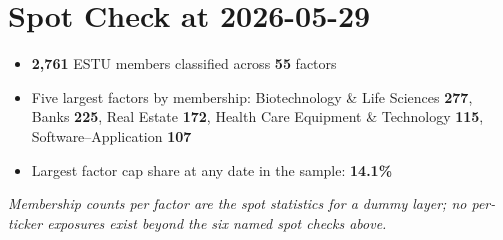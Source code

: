 \documentclass[11pt,a4paper]{article}
\newcommand{\NOTE}[1]{\textcolor{note}{\textit{#1}}}
\begin{document}
\section{Spot Check at 2026-05-29}

\begin{itemize}[leftmargin=*,topsep=2pt,itemsep=2pt]
  \item \textbf{2{,}761} ESTU members classified across \textbf{55} factors
  \item Five largest factors by membership: Biotechnology \& Life Sciences
    \textbf{277}, Banks \textbf{225}, Real Estate \textbf{172}, Health Care
    Equipment \& Technology \textbf{115}, Software--Application \textbf{107}
  \item Largest factor cap share at any date in the sample: \textbf{14.1\%}
\end{itemize}

\NOTE{Membership counts per factor are the spot statistics for a dummy layer;
no per-ticker exposures exist beyond the six named spot checks above.}
\end{document}
